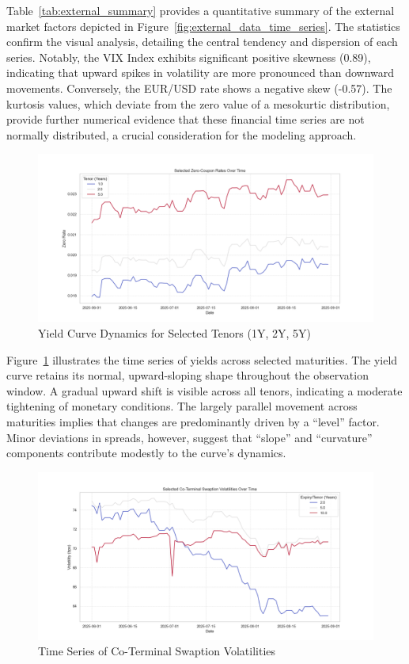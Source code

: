 Table~\ref{tab:external_summary} provides a quantitative summary of the external market factors depicted in Figure~\ref{fig:external_data_time_series}. The statistics confirm the visual analysis, detailing the central tendency and dispersion of each series. Notably, the VIX Index exhibits significant positive skewness (0.89), indicating that upward spikes in volatility are more pronounced than downward movements. Conversely, the EUR/USD rate shows a negative skew (-0.57). The kurtosis values, which deviate from the zero value of a mesokurtic distribution, provide further numerical evidence that these financial time series are not normally distributed, a crucial consideration for the modeling approach.

\begin{figure}[H]
	\centering
	\includegraphics[width=1\textwidth]{images/descriptive_data_analysis/yield_curve_selected_tenors.png}
	\caption{Yield Curve Dynamics for Selected Tenors (1Y, 2Y, 5Y)}
	\label{fig:yield_curve_selected_tenors}
\end{figure}

Figure~\ref{fig:yield_curve_selected_tenors} illustrates the time series of yields across selected maturities. The yield curve retains its normal, upward-sloping shape throughout the observation window. A gradual upward shift is visible across all tenors, indicating a moderate tightening of monetary conditions. The largely parallel movement across maturities implies that changes are predominantly driven by a “level” factor. Minor deviations in spreads, however, suggest that “slope” and “curvature” components contribute modestly to the curve’s dynamics.

\begin{figure}[H]
	\centering
	\includegraphics[width=1\textwidth]{images/descriptive_data_analysis/vol_surface_coterminal_series.png}
	\caption{Time Series of Co-Terminal Swaption Volatilities}
	\label{fig:vol_surface_coterminal_series}
\end{figure}

